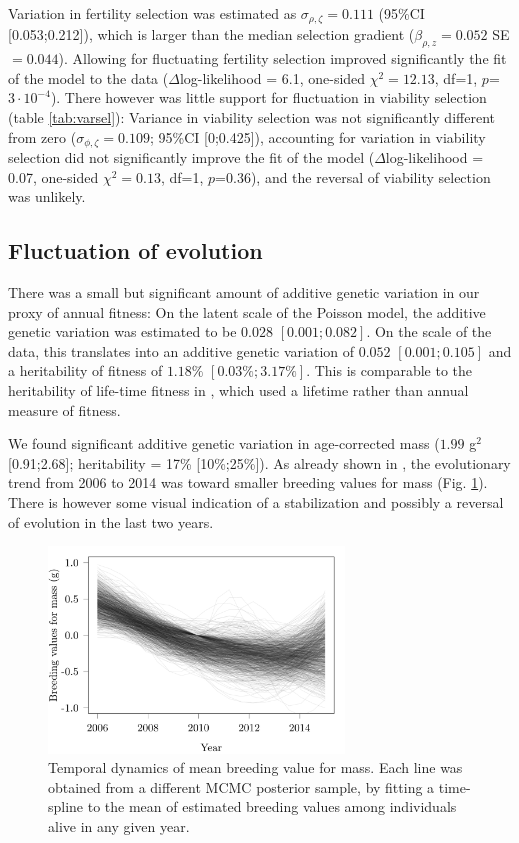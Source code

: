 Variation in fertility selection was estimated as $\sigma_{\rho,\zeta}=0.111$ (95\%CI [0.053;0.212]), which is larger than the median selection gradient ($\beta_{\rho,z}=0.052$ SE$=0.044$). Allowing for fluctuating fertility selection improved significantly the fit of the model to the data ($\Delta$log-likelihood = 6.1, one-sided $\chi^2=12.13$, df=1, $p$=$3\cdot10^{-4}$). There however was little support for fluctuation in viability selection (table \ref{tab:varsel}): Variance in viability selection was not significantly different from zero ($\sigma_{\phi,\zeta}=0.109$; 95\%CI [0;0.425]), accounting for variation in viability selection did not significantly improve the fit of the model ($\Delta$log-likelihood = 0.07, one-sided $\chi^2=0.13$, df=1, $p$=0.36), and the reversal of viability selection was unlikely.

\subsection*{Fluctuation of evolution}
There was a small but significant amount of additive genetic variation in our proxy of annual fitness: On the latent scale of the Poisson model, the additive genetic variation was estimated to be $0.028$ $[0.001;0.082]$. On the scale of the data, this translates into an additive genetic variation of $0.052$ $[0.001;0.105]$ and a heritability of fitness of $1.18\%$ $[0.03\%; 3.17\%]$. This is comparable to the heritability of life-time fitness in \cite{Bonnet2016}, which used a lifetime rather than annual measure of fitness. 

We found significant additive genetic variation in age-corrected mass ($1.99$ g$^2$ [0.91;2.68]; heritability = 17\% [10\%;25\%]). As already shown in \cite{Bonnet2016}, the evolutionary trend from 2006 to 2014 was toward smaller breeding values for mass (Fig. \ref{fig:evolsmooth}). There is however some visual indication of a stabilization and possibly a reversal of evolution in the last two years. 


\begin{figure}[ht]
\centering
\includegraphics[width=0.7\textwidth]{FiguresFluSel/EvolSmooth-1}
\caption{\footnotesize Temporal dynamics of mean breeding value for mass. Each line was obtained from a different MCMC posterior sample, by fitting a time-spline to the mean of estimated breeding values among individuals alive in any given year.}
\label{fig:evolsmooth}
\end{figure}

